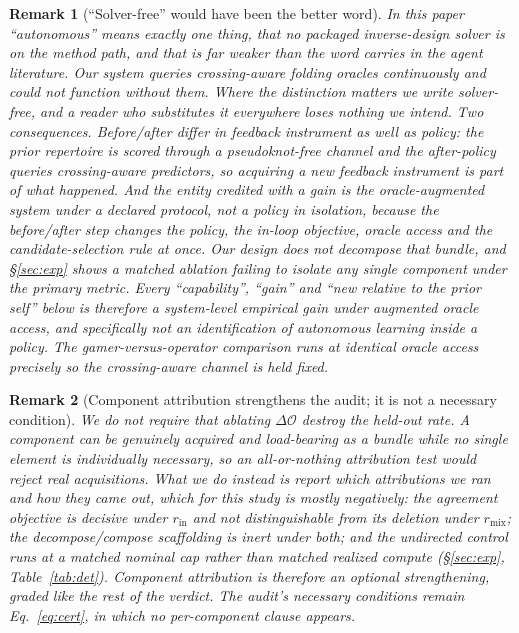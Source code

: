 \documentclass[11pt]{article}
\newtheorem{remark}{Remark}
\begin{document}
\begin{remark}[``Solver-free'' would have been the better word]\label{rem:autonomy}
In this paper ``autonomous'' means exactly one thing, that no packaged inverse-design solver is on the method
path, and that is far weaker than the word carries in the agent literature. Our system queries crossing-aware
folding oracles continuously and could not function without them. Where the distinction matters we write
\emph{solver-free}, and a reader who substitutes it everywhere loses nothing we intend. Two consequences.
Before/after differ in feedback instrument as well as policy: the prior repertoire is scored through a
pseudoknot-free channel and the after-policy queries crossing-aware predictors, so acquiring a new feedback
instrument is part of what happened. And the entity credited with a gain is the oracle-augmented system under a
declared protocol, not a policy in isolation, because the before/after step changes the policy, the in-loop
objective, oracle access and the candidate-selection rule at once. Our design does not decompose that bundle,
and \S\ref{sec:exp} shows a matched ablation failing to isolate any single component under the primary metric.
Every ``capability'', ``gain'' and ``new relative to the prior self'' below is therefore a system-level
empirical gain under augmented oracle access, and specifically not an identification of autonomous learning
inside a policy. The gamer-versus-operator comparison runs at identical oracle access precisely so the
crossing-aware channel is held fixed.
\end{remark}

\begin{remark}[Component attribution strengthens the audit; it is not a necessary condition]\label{rem:attrib}
We do not require that ablating $\Delta\mathcal O$ destroy the held-out rate. A component can be genuinely
acquired and load-bearing as a bundle while no single element is individually necessary, so an all-or-nothing
attribution test would reject real acquisitions. What we do instead is report which attributions we ran and how
they came out, which for this study is mostly negatively: the agreement objective is decisive under
$r_{\mathrm{in}}$ and not distinguishable from its deletion under $r_{\mathrm{mix}}$; the decompose/compose
scaffolding is inert under both; and the undirected control runs at a matched nominal cap rather than matched
realized compute (\S\ref{sec:exp}, Table~\ref{tab:det}). Component attribution is therefore an optional
strengthening, graded like the rest of the verdict. The audit's necessary conditions remain Eq.~\eqref{eq:cert},
in which no per-component clause appears.
\end{remark}
\end{document}
